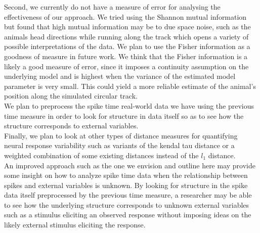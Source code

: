 Second, we currently do not have a measure of error for analysing the  effectiveness of our approach. 
We tried using the Shannon mutual information but found that  high  mutual information may be to due space noise, such as the animals head directions while running along the track which opens a variety of possible interpretations of the data.  We plan to use the Fisher information as a goodness of measure in future work. We think that the Fisher information is a likely a good measure of error, since it imposes a continuity assumption on the underlying model and is highest when  the variance of the estimated model parameter is very small. This could  yield a more reliable estimate of the animal's position along the simulated circular track. \\

We plan to preprocess the spike time real-world  data we have using the previous time measure  in order to look for
structure in data itself so as to see how the structure corresponds to external variables.\\

Finally, we plan to look at other types of distance measures for quantifying neural response variability such as variants of the kendal tau distance  or a weighted combination of some existing distances instead of the $l_1$ distance.\\

An improved approach such as the one we envision and outline here  may provide some insight on how to analyze
spike time data when the relationship between spikes and external variables is unknown.  By looking for structure in the 
spike data itself preprocessed by the previous time measure,  a researcher may be able to see how the underlying structure
corresponds to unknown external variables such as a stimulus eliciting an observed response without imposing ideas  on the likely external stimulus eliciting the response.















